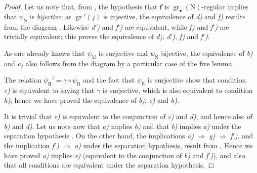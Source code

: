 \begin{proof}
Let us note that, from , the hypothesis that $\mathbf{f}$ is $\operatorname{gr}_\bullet(\mathrm{N})$-regular implies that $\psi_\mathrm{N}$ is \emph{bijective}; as $\operatorname{gr}'(j)$ is injective, the equivalence of \emph{d)} and \emph{f)} results from the diagram . Likewise \emph{d$'$)} and \emph{f$'$)} are equivalent, while \emph{f)} and \emph{f$'$)} are trivially equivalent; this proves the equivalence of \emph{d)}, \emph{d$'$)}, \emph{f)} and \emph{f$'$)}.

As one already knows that $\psi_\mathrm{M}$ is surjective and $\psi_\mathrm{N}$ bijective, the equivalence of \emph{b)} and \emph{c)} also follows from the diagram  by a particular case of the five lemma.

The relation $\psi_\mathrm{R}'=\gamma\circ\psi_\mathrm{R}$  and the fact that $\psi_\mathrm{R}$ is surjective show that condition \emph{c)} is equivalent to saying that $\gamma$ is surjective, which is also equivalent to condition \emph{h)}; hence we have proved the equivalence of \emph{b)}, \emph{c)} and \emph{h)}.

It is trivial that \emph{e)} is equivalent to the conjunction of \emph{c)} and \emph{d)}, and hence also of \emph{b)} and \emph{d)}. Let us note now that \emph{a)} implies \emph{b)} and that \emph{b)} implies \emph{a)} under the separation hypothesis . On the other hand, the implications \emph{a)} $\Rightarrow$ \emph{g)} $\Rightarrow$ \emph{f$'$)}, and the implication \emph{f$'$)} $\Rightarrow$ \emph{a)} under the separation hypothesis, result from . Hence we have proved \emph{a)} implies \emph{e)} (equivalent to the conjunction of \emph{b)} and \emph{f$'$)}), and also that all conditions are equivalent under the separation hypothesis.
\end{proof}

